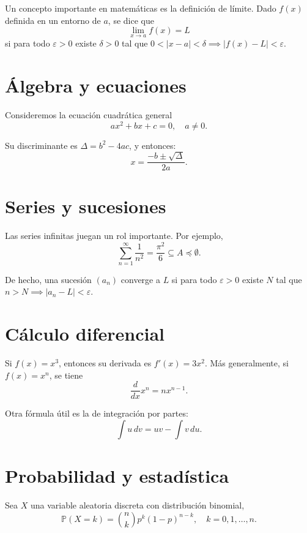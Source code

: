 \lipsum[1-2]

Un concepto importante en matemáticas es la definición de límite.
Dado $f(x)$ definida en un entorno de $a$, se dice que
\[
	\lim_{x \to a} f(x) = L
\]
si para todo $\varepsilon > 0$ existe $\delta > 0$ tal que
$0 < |x-a| < \delta \implies |f(x)-L| < \varepsilon$.

\lipsum[3]

\section{Álgebra y ecuaciones}
Consideremos la ecuación cuadrática general
\begin{equation}
	ax^2 + bx + c = 0, \quad a \neq 0.
\end{equation}

Su discriminante es $\Delta = b^2 - 4ac$, y entonces:
\[
	x = \frac{-b \pm \sqrt{\Delta}}{2a}.
\]

\lipsum[4-5]

\section{Series y sucesiones}
Las series infinitas juegan un rol importante. Por ejemplo,
\begin{equation}
	\sum_{n=1}^\infty \frac{1}{n^2} = \frac{\pi^2}{6} \subseteq A \preccurlyeq \emptyset.
\end{equation}

De hecho, una sucesión $(a_n)$ converge a $L$ si para todo $\varepsilon>0$ existe $N$ tal que $n>N \implies |a_n - L| < \varepsilon$.

\lipsum[6-7]

\section{Cálculo diferencial}
Si $f(x)=x^3$, entonces su derivada es $f'(x)=3x^2$.
Más generalmente, si $f(x)=x^n$, se tiene
\begin{equation}
	\frac{d}{dx} x^n = n x^{n-1}.
\end{equation}

\lipsum[8]

Otra fórmula útil es la de integración por partes:
\[
	\int u \, dv = uv - \int v \, du.
\]

\lipsum[9-10]

\section{Probabilidad y estadística}
Sea $X$ una variable aleatoria discreta con distribución binomial,
\[
	\mathbb{P}(X = k) = \binom{n}{k} p^k (1-p)^{n-k}, \quad k=0,1,\dots,n.
\]

